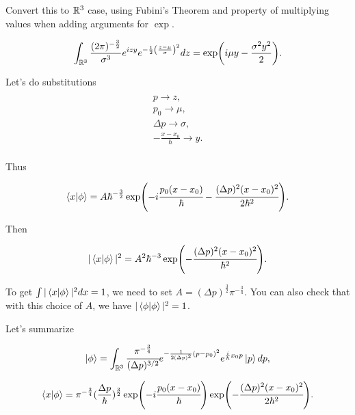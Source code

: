 \documentclass[main.tex]{subfiles}
\begin{document}
Convert this to $\mathbb{R}^3$ case, using Fubini's Theorem and property of multiplying values when adding arguments for $\exp$.

\begin{equation}
\int_{\mathbb{R}^3} \frac{(2\pi)^{-\frac{3}{2}}}{\sigma^3} e^{izy} e^{-\frac{1}{2}\left(\frac{z-\mu}{\sigma}\right)^2}dz = \exp(i\mu y - \frac{\sigma^2 y^2}{2}).
\end{equation}

Let's do substitutions
\begin{multline*}\\
p \to z,\\
p_0 \to \mu, \\
\Delta p \to \sigma, \\
-\frac{x - x_0}{\hbar} \to y.
\\
\end{multline*}

Thus

\begin{equation}
\bra{x}\ket{\phi} = A \hbar^{-\frac{3}{2}}
\exp(-i\cfrac{p_0(x - x_0)}{\hbar} - \cfrac{(\Delta p)^2(x - x_0)^2}{2\hbar^2}).
\end{equation}

Then

\begin{equation}
|\bra{x}\ket{\phi}|^2 = A^2 \hbar^{-3} \exp(- \cfrac{(\Delta p)^2(x - x_0)^2}{\hbar^2}).
\end{equation}

To get $\int |\bra{x}\ket{\phi}|^2 dx = 1$, we need to set $A = (\Delta p)^{\frac{3}{2}} \pi^{-\frac{3}{4}}$. You can also check that with this choice of $A$, we have $|\bra{\phi}\ket{\phi}|^2 = 1$.

Let's summarize

\begin{equation}
\ket{\phi} = \int_{\mathbb{R}^3} \cfrac{\pi^{-\frac{3}{4}}}{(\Delta p)^{3/2}} e^{-\frac{1}{2(\Delta p)^2}(p - p_0)^2} e^{\frac{i}{\hbar}x_0 p}\ket{p} dp,
\end{equation}

\begin{equation}
\bra{x}\ket{\phi} =  \pi^{-\frac{3}{4}} (\frac{\Delta p}{\hbar})^{\frac{3}{2}} 
\exp(-i\cfrac{p_0(x - x_0)}{\hbar})\exp( - \cfrac{(\Delta p)^2(x - x_0)^2}{2\hbar^2}).
\end{equation}
\end{document}

